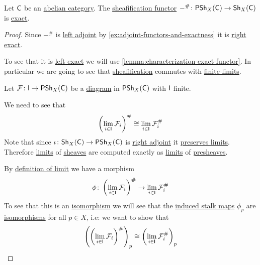 \documentclass[../../main]{subfiles}
\begin{document}
\begin{proposition}\label{prop:sheafification-is-exact}
  Let \(\mathsf{C}\) be an \hyperref[def:abelian-category]{abelian category}.
  The \hyperref[def:sheafification]{sheafification functor} \(-^{\#}\colon \mathsf{PSh}_{X}(\mathsf{C}) \to \mathsf{Sh}_{X}(\mathsf{C})\) is \hyperref[def:exact-functor]{exact}.
\end{proposition}
\begin{proof}
  Since \(-^{\#}\) is \hyperref[def:adjoint-functors]{left adjoint} by \autoref{ex:adjoint-functors-and-exactness} it is \hyperref[def:exact-functor]{right exact}.

  To see that it is \hyperref[def:exact-functor]{left exact} we will use \autoref{lemma:characterization-exact-functor}.
  In particular we are going to see that \hyperref[def:sheafification]{sheafification} commutes with \hyperref[def:categorical-limit]{finite limits}.

  Let \(\mathcal{F}\colon \mathsf{I} \to \mathsf{PSh}_{X}(\mathsf{C})\) be a \hyperref[def:diagram]{diagram} in \(\mathsf{PSh}_{X}(\mathsf{C})\) with \(\mathsf{I}\) finite.

  We need to see that
  \begin{equation*}
    \left( \lim_{i \in \mathsf{I}} \mathcal{F}_{i} \right)^{\#} \cong \lim_{i \in \mathsf{I}} \mathcal{F}_{i}^{\#}
  \end{equation*}
  Note that since \(\iota\colon \mathsf{Sh}_{X}(\mathsf{C}) \to \mathsf{PSh}_{X}(\mathsf{C})\) is \hyperref[def:adjoint-functors]{right adjoint} it \hyperref[thm:adjoints-preserve-limits]{preserves limits}. Therefore \hyperref[def:categorical-limit]{limits} of \hyperref[def:sheaf]{sheaves} are computed exactly as \hyperref[def:categorical-limit]{limits} of \hyperref[def:presheaf]{presheaves}.

  By \hyperref[def:categorical-limit]{definition of limit} we have a morphism
  \begin{equation*}
    \phi\colon \left( \lim_{i \in \mathsf{I}} \mathcal{F}_{i} \right)^{\#} \to \lim_{i \in \mathsf{I}} \mathcal{F}_{i}^{\#}
  \end{equation*}
  To see that this is an \hyperref[def:categorical-isomorphism]{isomorphism} we will see that the \hyperref[def:stalk]{induced stalk maps} \(\phi_{p}\) are \hyperref[def:categorical-isomorphism]{isomorphisms} for all \(p \in X\), i.e: we want to show that
  \begin{equation*}
    \left( \left( \lim_{i \in \mathsf{I}} \mathcal{F}_{i} \right)^{\#} \right)_{p} \cong \left( \lim_{i \in \mathsf{I}} \mathcal{F}_{i}^{\#} \right)_{p}
  \end{equation*}



\end{proof}
\end{document}
